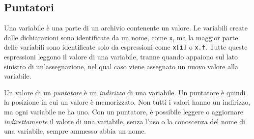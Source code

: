 \subsection{Puntatori}
\label{subsec:puntatori}%
Una variabile è una parte di un archivio contenente un valore.
Le variabili create dalle dichiarazioni sono identificate da un nome, come \verb|x|, ma la maggior parte delle variabili sono identificate solo da espressioni come \verb|x[i]| o \verb|x.f|.
Tutte queste espressioni leggono il valore di una variabile, tranne quando appaiono sul lato sinistro di un'assegnazione, nel qual caso viene assegnato un nuovo valore alla variabile.

Un valore di un \textit{puntatore} è un \textit{indirizzo} di una variabile.
Un puntatore è quindi la posizione in cui un valore è memorizzato.
Non tutti i valori hanno un indirizzo, ma ogni variabile ne ha uno.
Con un puntatore, è possibile leggere o aggiornare \textit{indirettamente} il valore di una variabile, senza l'uso o la conoscenza del nome di una variabile, sempre ammesso abbia un nome.

